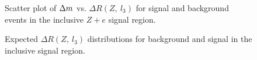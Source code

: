 \begin{itemize}
  \begin{figure}[h]
  	\centering
  	\caption{Scatter plot of $\Delta m$ vs. $\Delta R(Z,\ l_3)$ for signal and background events in the inclusive $Z+e$ signal region.}
  	\label{fig:DeltaM-dR}
  \end{figure}

 \begin{figure}[h]
 	\centering
 	\caption{Expected $\Delta R(Z,\ l_3)$ distributions for background and signal in the inclusive signal region.}
 	\label{fig:inclusive-SR-dR}
 \end{figure}
  

\end{itemize}
